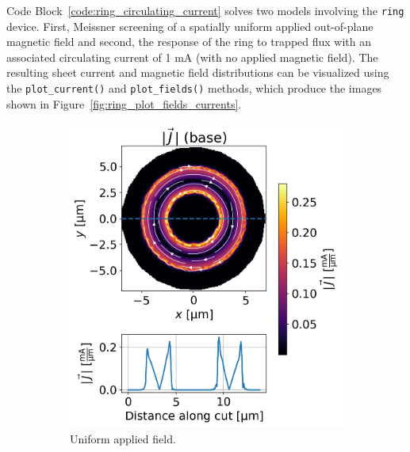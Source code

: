 \documentclass[final,3p,times]{elsarticle}
\newcommand{\inline}[1]{\texttt{#1}\xspace}
\begin{document}
Code Block~\ref{code:ring_circulating_current} solves two models involving the \inline{ring} device. First, Meissner screening of a spatially uniform applied out-of-plane magnetic field and second, the response of the ring to trapped flux with an associated circulating current of 1 mA (with no applied magnetic field). The resulting sheet current and magnetic field distributions can be visualized using the \inline{plot_current()} and \inline{plot_fields()} methods, which produce the images shown in Figure~\ref{fig:ring_plot_fields_currents}.


\begin{figure}[!h]
\centering
\begin{subfigure}{.235\textwidth}
  \centering
  \includegraphics[width=\linewidth]{examples/images/ring/circular_ring_uniform_plot_currents.png}
  \caption{Uniform applied field.}
  \label{fig:circular_ring_plot_currents}
\end{subfigure}
\begin{subfigure}{.235\textwidth}
  \centering

\end{subfigure}
\end{figure}
\end{document}
